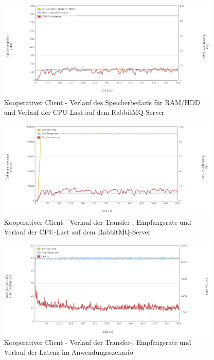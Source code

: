 \documentclass[	a4paper,
			11pt,
			oneside,
			parskip]{scrartcl}
\begin{document}
		\begin{figure}[!htb]
			\centering
			\includegraphics[width=\textwidth]{img/ack/ack_server1.png}
			\caption{Kooperativer Client - Verlauf des Speicherbedarfs für RAM/HDD und Verlauf der CPU-Last auf dem RabbitMQ-Server}
			\label{fig:ack-server1}
		\end{figure}
		
		\begin{figure}[!htb]
			\centering
			\includegraphics[width=\textwidth]{img/ack/ack_server2.png}
			\caption{Kooperativer Client - Verlauf der Transfer-, Empfangsrate und Verlauf der CPU-Last auf dem RabbitMQ-Server}
			\label{fig:ack-server2}
		\end{figure}
		
		\begin{figure}[!htb]
			\centering
			\includegraphics[width=\textwidth]{img/ack/ack_scenario.png}
			\caption{Kooperativer Client - Verlauf der Transfer-, Empfangsrate und Verlauf der Latenz im Anwendungsszenario}
			\label{fig:ack-scenario}
		\end{figure}
	
\end{document}
